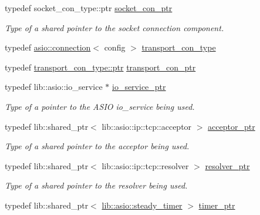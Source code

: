 \begin{DoxyCompactItemize}
typedef socket\+\_\+con\+\_\+type\+::ptr \hyperlink{classwebsocketpp_1_1transport_1_1asio_1_1endpoint_a74fb719ac5393b320d98b77f346a4b34}{socket\+\_\+con\+\_\+ptr}
\begin{DoxyCompactList}\small\item\em Type of a shared pointer to the socket connection component. \end{DoxyCompactList}\item 
typedef \hyperlink{classwebsocketpp_1_1transport_1_1asio_1_1connection}{asio\+::connection}$<$ config $>$ \hyperlink{classwebsocketpp_1_1transport_1_1asio_1_1endpoint_a75f3102766fd3ba8230e99a2b0e00457}{transport\+\_\+con\+\_\+type}
\item 
typedef \hyperlink{classwebsocketpp_1_1transport_1_1asio_1_1connection_aa6f25556860a154c4dacb4dac1dce8e4}{transport\+\_\+con\+\_\+type\+::ptr} \hyperlink{classwebsocketpp_1_1transport_1_1asio_1_1endpoint_ac5fc306f32d15f92dd1b22366eaba62d}{transport\+\_\+con\+\_\+ptr}
\item 
typedef lib\+::asio\+::io\+\_\+service $\ast$ \hyperlink{classwebsocketpp_1_1transport_1_1asio_1_1endpoint_acc7e89c6427514628f551cf3f795b7e0}{io\+\_\+service\+\_\+ptr}
\begin{DoxyCompactList}\small\item\em Type of a pointer to the A\+S\+I\+O io\+\_\+service being used. \end{DoxyCompactList}\item 
typedef lib\+::shared\+\_\+ptr$<$ lib\+::asio\+::ip\+::tcp\+::acceptor $>$ \hyperlink{classwebsocketpp_1_1transport_1_1asio_1_1endpoint_aaff1078ca1ea0fa4f47bbabcae255c16}{acceptor\+\_\+ptr}
\begin{DoxyCompactList}\small\item\em Type of a shared pointer to the acceptor being used. \end{DoxyCompactList}\item 
typedef lib\+::shared\+\_\+ptr$<$ lib\+::asio\+::ip\+::tcp\+::resolver $>$ \hyperlink{classwebsocketpp_1_1transport_1_1asio_1_1endpoint_aff1899396fa9d1439e00ca53c56676a5}{resolver\+\_\+ptr}
\begin{DoxyCompactList}\small\item\em Type of a shared pointer to the resolver being used. \end{DoxyCompactList}\item 
typedef lib\+::shared\+\_\+ptr$<$ \hyperlink{namespacewebsocketpp_1_1lib_1_1asio_a156f3dad489fb17e3bc79d2009d2656f}{lib\+::asio\+::steady\+\_\+timer} $>$ \hyperlink{classwebsocketpp_1_1transport_1_1asio_1_1endpoint_a1802f5762009dbed117ff793fa87468f}{timer\+\_\+ptr}

\end{DoxyCompactItemize}

